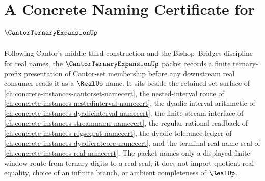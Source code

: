 \chapter{A Concrete Naming Certificate for $\CantorTernaryExpansionUp$}
\label{ch:concrete-instances-cantor-ternary-expansion-namecert}

Following Cantor's middle-third construction and the Bishop--Bridges discipline for real names, the $\CantorTernaryExpansionUp$ packet records a finite ternary-prefix presentation of Cantor-set membership before any downstream real consumer reads it as a $\RealUp$ name. It sits beside the retained-set surface of \autoref{ch:concrete-instances-cantorset-namecert}, the nested-interval route of \autoref{ch:concrete-instances-nestedinterval-namecert}, the dyadic interval arithmetic of \autoref{ch:concrete-instances-dyadicinterval-namecert}, the finite stream interface of \autoref{ch:concrete-instances-streamname-namecert}, the regular rational readback of \autoref{ch:concrete-instances-regseqrat-namecert}, the dyadic tolerance ledger of \autoref{ch:concrete-instances-dyadicratcore-namecert}, and the terminal real-name seal of \autoref{ch:concrete-instances-real-namecert}. The packet names only a displayed finite-window route from ternary digits to a real seal; it does not import quotient real equality, choice of an infinite branch, or ambient completeness of $\RealUp$.

